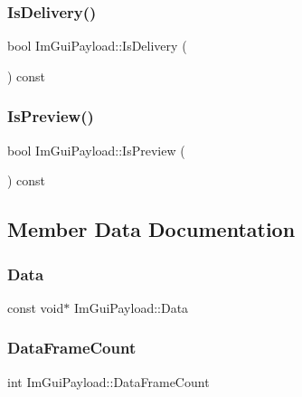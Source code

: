 \hypertarget{struct_im_gui_payload_adcc193e0d454bf394e76e5498eea808d}{}\label{struct_im_gui_payload_adcc193e0d454bf394e76e5498eea808d} 
\subsubsection{\texorpdfstring{Is\+Delivery()}{IsDelivery()}}
{\footnotesize\ttfamily bool Im\+Gui\+Payload\+::\+Is\+Delivery (\begin{DoxyParamCaption}{ }\end{DoxyParamCaption}) const}

\hypertarget{struct_im_gui_payload_a4a7e17de25fd86c5ada447aaec412070}{}\label{struct_im_gui_payload_a4a7e17de25fd86c5ada447aaec412070} 
\subsubsection{\texorpdfstring{Is\+Preview()}{IsPreview()}}
{\footnotesize\ttfamily bool Im\+Gui\+Payload\+::\+Is\+Preview (\begin{DoxyParamCaption}{ }\end{DoxyParamCaption}) const}



\subsection{Member Data Documentation}
\hypertarget{struct_im_gui_payload_a4a61d87ab86d89dddc4fd886f5446d21}{}\label{struct_im_gui_payload_a4a61d87ab86d89dddc4fd886f5446d21} 
\subsubsection{\texorpdfstring{Data}{Data}}
{\footnotesize\ttfamily const void$\ast$ Im\+Gui\+Payload\+::\+Data}

\hypertarget{struct_im_gui_payload_ab9f21d2454197d14896d5812ba70fa33}{}\label{struct_im_gui_payload_ab9f21d2454197d14896d5812ba70fa33} 
\subsubsection{\texorpdfstring{Data\+Frame\+Count}{DataFrameCount}}
{\footnotesize\ttfamily int Im\+Gui\+Payload\+::\+Data\+Frame\+Count}

